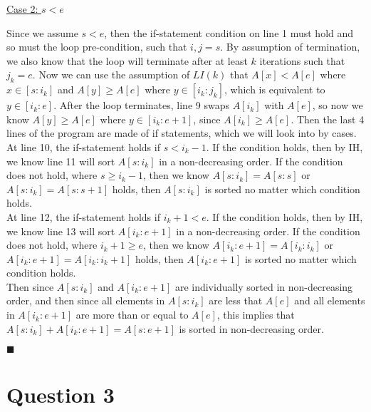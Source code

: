 \documentclass[20pt]{article}
\begin{document}
\noindent
\underline{Case 2: $s < e$}\\
\begin{text}
    Since we assume $s < e$, then the if-statement condition on line 1 must hold and so must the loop pre-condition, such that $i, j = s$. By assumption of termination, we also know that the loop will terminate after at least $k$ iterations such that $j_k = e$. Now we can use the assumption of $LI(k)$ that $A[x] < A[e]$ where $x \in [s:i_k]$ and $A[y] \geq A[e]$ where $y \in [i_k:j_k]$, which is equivalent to $y \in [i_k:e]$. After the loop terminates, line 9 swaps $A[i_k]$ with $A[e]$, so now we know $A[y] \geq A[e]$ where $y \in [i_k:e + 1]$, since $A[i_k] \geq A[e]$. Then the last 4 lines of the program are made of if statements, which we will look into by cases.\\
    
    \noindent
    At line 10, the if-statement holds if $s < i_k - 1$. If the condition holds, then by IH, we know line 11 will sort $A[s:i_k]$ in a non-decreasing order. If the condition does not hold, where $s \geq i_k - 1$, then we know $A[s:i_k] = A[s:s]$ or $A[s:i_k] = A[s:s+1]$ holds, then $A[s:i_k]$ is sorted no matter which condition holds.\\
    
    \noindent
    At line 12, the if-statement holds if $i_k + 1 < e$. If the condition holds, then by IH, we know line 13 will sort $A[i_k:e+1]$ in a non-decreasing order. If the condition does not hold, where $i_k + 1 \geq e$, then we know $A[i_k:e+1] = A[i_k:i_k]$ or $A[i_k:e+1] = A[i_k:i_k + 1]$ holds, then $A[i_k:e+1]$ is sorted no matter which condition holds.\\
    
    \noindent
    Then since $A[s:i_k]$ and $A[i_k:e+1]$ are individually sorted in non-decreasing order, and then since all elements in $A[s:i_k]$ are less that $A[e]$ and all elements in $A[i_k:e+1]$ are more than or equal to $A[e]$, this implies that $A[s:i_k] + A[i_k:e+1] = A[s:e + 1]$ is sorted in non-decreasing order.
    
    \hfill $\blacksquare$
\end{text}


\newpage

\section*{Question 3}
\end{document}
